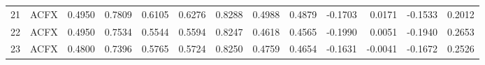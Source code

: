 \begin{tabular}{rlrrrrrrrrrrr}
    21 &   ACFX &  0.4950 &          0.7809 &  0.6105 &            0.6276 &          0.8288 &     0.4988 &      0.4879 &          -0.1703 &         0.0171 &    -0.1533 &                          0.2012 \\
    22 &   ACFX &  0.4950 &          0.7534 &  0.5544 &            0.5594 &          0.8247 &     0.4618 &      0.4565 &          -0.1990 &         0.0051 &    -0.1940 &                          0.2653 \\
    23 &   ACFX &  0.4800 &          0.7396 &  0.5765 &            0.5724 &          0.8250 &     0.4759 &      0.4654 &          -0.1631 &        -0.0041 &    -0.1672 &                          0.2526 \\
\bottomrule
\end{tabular}

